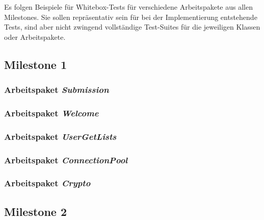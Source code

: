 \lstset{
    language=Java,
    basicstyle=\ttfamily\selectfont\scriptsize,
}

\newcommand{\testlisting}[1]{}

Es folgen Beispiele für Whitebox-Tests für verschiedene Arbeitspakete aus allen Milestones.
Sie sollen repräsentativ sein für bei der Implementierung entstehende Tests, sind aber nicht zwingend vollständige
Test-Suites für die jeweiligen Klassen oder Arbeitspakete.

\subsection{Milestone 1}\label{subsec:milestone1}

\subsubsection{Arbeitspaket \emph{Submission}}
\testlisting{SubmissionBackingTest}
\testlisting{SubmissionServiceTest}
\testlisting{SubmissionRepositoryTest}

\subsubsection{Arbeitspaket \emph{Welcome}}
\testlisting{LoginServiceTest}

\subsubsection{Arbeitspaket \emph{UserGetLists}}
\testlisting{UserRepositoryGetListTest}

\subsubsection{Arbeitspaket \emph{ConnectionPool}}
\testlisting{TransactionTest}
\testlisting{ConnectionPoolTest}

\subsubsection{Arbeitspaket \emph{Crypto}}
\testlisting{HashingTest}

\subsection{Milestone 2}\label{subsec:milestone2}


